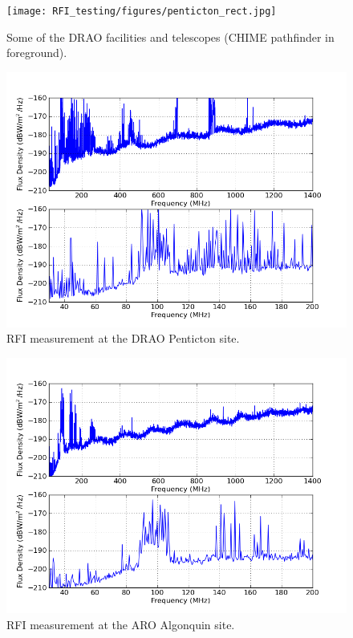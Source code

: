 \begin{figure}[htb]
\begin{center}
\texttt{[image: RFI\_testing/figures/penticton\_rect.jpg]}
\caption{Some of the DRAO facilities and telescopes (CHIME pathfinder in foreground). }
\label{Fig:penticton}
\end{center}
\end{figure}

\begin{figure}[htb]
\begin{center}
\includegraphics[width=0.9\linewidth]{RFI_testing/figures/DRAO_cal.png}
\caption{RFI measurement at the DRAO Penticton site. }
\label{Fig:draorfi}
\end{center}
\end{figure}

\begin{figure}[tb]
\begin{center}
\includegraphics[width=0.9\linewidth]{RFI_testing/figures/ALG_cal.png}
\caption{RFI measurement at the ARO Algonquin site.}
\label{Fig:arorfi}
\end{center}
\end{figure}


